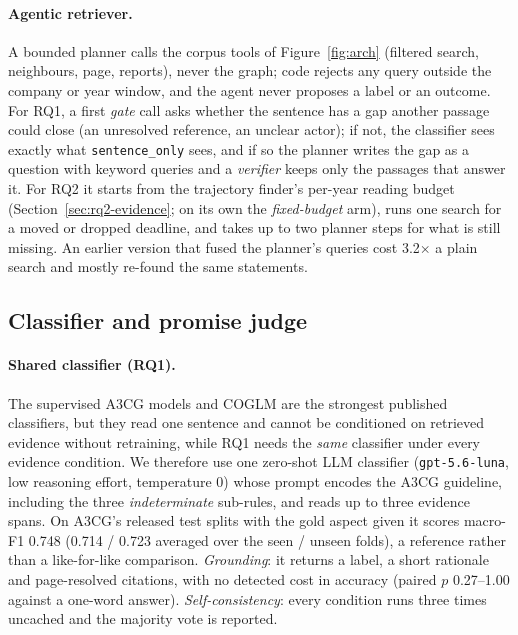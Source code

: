\documentclass[11pt]{article}
\newcommand{\chatmodel}{\texttt{gpt-5.6-luna}}
\newcommand{\cond}[1]{\texttt{#1}}
\begin{document}
\paragraph{Agentic retriever.}
\label{sec:agentic}
A bounded planner calls the corpus tools of Figure~\ref{fig:arch} (filtered search, neighbours, page, reports), never the graph; code rejects any query outside the company or year window, and the agent never proposes a label or an outcome. For RQ1, a first \emph{gate} call asks whether the sentence has a gap another passage could close (an unresolved reference, an unclear actor); if not, the classifier sees exactly what \cond{sentence\_only} sees, and if so the planner writes the gap as a question with keyword queries and a \emph{verifier} keeps only the passages that answer it. For RQ2 it starts from the trajectory finder's per-year reading budget (Section~\ref{sec:rq2-evidence}; on its own the \emph{fixed-budget} arm), runs one search for a moved or dropped deadline, and takes up to two planner steps for what is still missing. An earlier version that fused the planner's queries cost 3.2$\times$ a plain search and mostly re-found the same statements.

\subsection{Classifier and promise judge}

\paragraph{Shared classifier (RQ1).}
\label{sec:classifier}
The supervised A3CG models and COGLM are the strongest published classifiers, but they read one sentence and cannot be conditioned on retrieved evidence without retraining, while RQ1 needs the \emph{same} classifier under every evidence condition. We therefore use one zero-shot LLM classifier (\chatmodel{}, low reasoning effort, temperature 0) whose prompt encodes the A3CG guideline, including the three \emph{indeterminate} sub-rules, and reads up to three evidence spans. On A3CG's released test splits with the gold aspect given it scores macro-F1 0.748 (0.714 / 0.723 averaged over the seen / unseen folds), a reference rather than a like-for-like comparison. \emph{Grounding}: it returns a label, a short rationale and page-resolved citations, with no detected cost in accuracy (paired $p$ 0.27--1.00 against a one-word answer). \emph{Self-consistency}: every condition runs three times uncached and the majority vote is reported.
\end{document}
